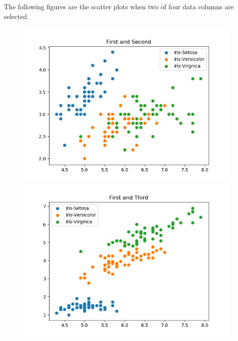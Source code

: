 \documentclass[a4paper]{article}
\begin{document}
	The following figures are the scatter plots when two of four data columns are selected.
	\begin{figure}[h!]
		\centering
		\begin{minipage}[t]{6.5cm}
			\includegraphics[width=1.0\textwidth]{12.png}
		\end{minipage}
		\hspace{2cm}
		\begin{minipage}[t]{6.5cm}
			\includegraphics[width=1.0\textwidth]{13.png}
		\end{minipage}
		\begin{minipage}[t]{6.5cm}

\end{minipage}
\end{figure}
\end{document}
